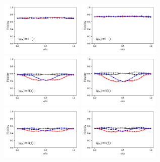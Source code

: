 \documentclass[a4paper]{article}
\begin{document}
\begin{figure}[H]
	\\
	\includegraphics[width=0.35\textwidth]{fidelity_qc9_mit1_state3}
	\includegraphics[width=0.35\textwidth]{fidelity_qc9_mit0_state3}
	\\
	\includegraphics[width=0.35\textwidth]{fidelity_qc9_mit1_state4}
	\includegraphics[width=0.35\textwidth]{fidelity_qc9_mit0_state4}
	\\
	\includegraphics[width=0.35\textwidth]{fidelity_qc9_mit1_state5}
	\includegraphics[width=0.35\textwidth]{fidelity_qc9_mit0_state5}
\end{figure}
\end{document}
